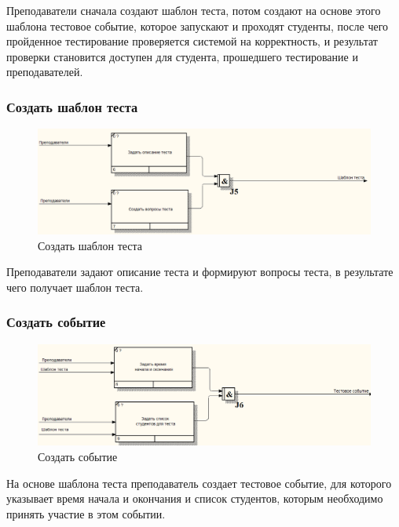 Преподаватели сначала создают шаблон теста, потом создают на основе этого шаблона
тестовое событие, которое запускают и проходят студенты, после чего пройденное 
тестирование проверяется системой на корректность, и результат проверки становится
доступен для студента, прошедшего тестирование и преподавателей.

\subsubsection{Создать шаблон теста}
\begin{figure}[H]
    \includegraphics[width=\textwidth, center]{../img/idef3/CreateTestTemplate.png}
    \caption{Создать шаблон теста}
\end{figure}

Преподаватели задают описание теста и формируют вопросы теста, в результате чего
получает шаблон теста.

\subsubsection{Создать событие}
\begin{figure}[H]
    \includegraphics[width=\textwidth, center]{../img/idef3/CreateTestInstance.png}
    \caption{Создать событие}
\end{figure}

На основе шаблона теста преподаватель создает тестовое событие, для которого указывает
время начала и окончания и список студентов, которым необходимо принять участие
в этом событии.

